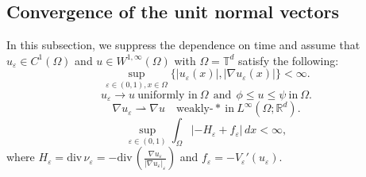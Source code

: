 \documentclass{amsart}
\theoremstyle{definition}
\newcommand{\divergence}{\mathrm{div}\,}
\begin{document}
\subsection{Convergence of the unit normal vectors}
In this subsection, we suppress the dependence on time and assume that $u_\varepsilon \in C^1(\Omega)$ and $ u \in W^{1,\infty} (\Omega)$ with $\Omega=\mathbb{T}^d$ satisfy
the following:
\begin{equation}
\label{A1}
\tag{A1}
\sup_{\varepsilon \in (0,1), x \in \Omega} \{ |u_\varepsilon (x)|, |\nabla u_\varepsilon (x)| \}<\infty.
\end{equation}
\begin{equation}
\label{A2} 
\tag{A2}
u_\varepsilon \to u \ \text{uniformly in} \ \Omega \ \ \text{and} \ \ \phi \leq u \leq \psi \  \text{in} \ \Omega.
\end{equation}
\begin{equation}
\label{A3} 
\tag{A3}
\nabla u_\varepsilon \rightharpoonup \nabla u \quad \text{weakly-}\ast \ \text{in} \ L^\infty (\Omega ; \mathbb{R}^d).
\end{equation}
\begin{equation}
\label{A4}
\tag{A4}
\sup_{\varepsilon \in (0,1)} \int_{\Omega} |-H_\varepsilon + f_\varepsilon| \, dx<\infty,
\end{equation}
where $H_\varepsilon = \divergence \nu_\varepsilon = -\divergence \left( \frac{\nabla u_\varepsilon}{|\nabla u_\varepsilon |_\varepsilon} \right)$ and $f_\varepsilon=-V_\varepsilon'(u_\varepsilon)$.
\end{document}
